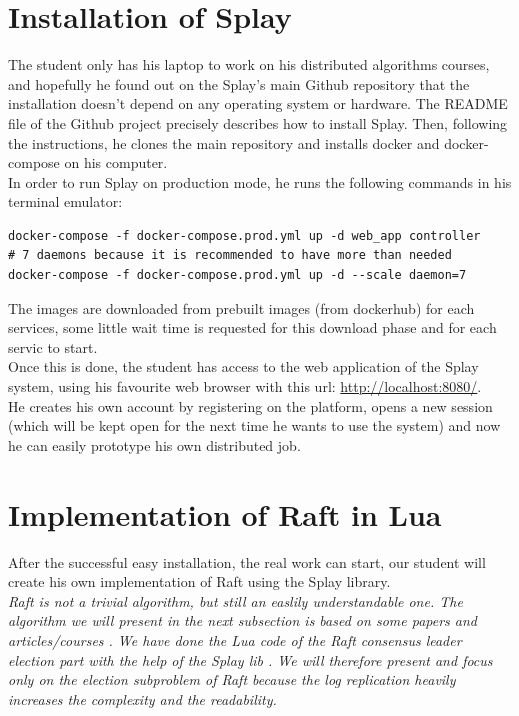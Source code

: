 \documentclass{eplmastersthesis}
\begin{document}
      \section{Installation of Splay}

        The student only has his laptop to work on his distributed algorithms
        courses, and hopefully he found out on the Splay's main Github
        repository \cite{SplayV2Git} that the installation doesn't depend on
        any operating system or hardware. The README file of the Github project
        precisely describes how to install Splay. Then, following the
        instructions, he clones the main repository and installs docker and
        docker-compose on his computer.\\
        In order to run Splay on production mode, he runs the following
        commands in his terminal emulator: \\

        \begin{lstlisting}[style=MyBash]
docker-compose -f docker-compose.prod.yml up -d web_app controller
# 7 daemons because it is recommended to have more than needed
docker-compose -f docker-compose.prod.yml up -d --scale daemon=7
        \end{lstlisting}

        The images are downloaded from prebuilt images (from dockerhub) for
        each services, some little wait time is requested for this download
        phase and for each servic to start.\\
        Once this is done, the student has access to the web application of
        the Splay system, using his favourite web browser with this url:
        \url{http://localhost:8080/}.\\
        He creates his own account by registering on the platform, opens a new
        session (which will be kept open for the next time he wants to use
        the system) and now he can easily prototype his own distributed job.

      \section{Implementation of Raft in Lua}

        After the successful easy installation, the real work can start, our
        student will create his own implementation of Raft using the Splay
        library.\\

        \textit{Raft is not a trivial algorithm, but still an easlily understandable
        one. The algorithm we will present in the next subsection is based on
        some papers \cite{RaftPaper} and articles/courses \cite{RaftSlide}
        \cite{RaftSite}. We have done the Lua code of the Raft consensus leader
        election part with the help of the Splay lib \cite{SplayLib}.
        We will therefore present and focus only on the election subproblem of
        Raft because the log replication heavily increases the complexity and
        the readability.}
\end{document}

